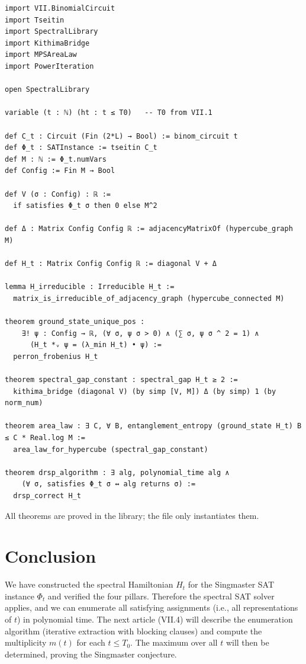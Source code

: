 \documentclass[11pt,a4paper]{article}
\begin{document}
\begin{lstlisting}[style=lean, caption={SeriesVII/SingmasterHamiltonian.lean (excerpt)}]
import VII.BinomialCircuit
import Tseitin
import SpectralLibrary
import KithimaBridge
import MPSAreaLaw
import PowerIteration

open SpectralLibrary

variable (t : ℕ) (ht : t ≤ T0)   -- T0 from VII.1

def C_t : Circuit (Fin (2*L) → Bool) := binom_circuit t
def Φ_t : SATInstance := tseitin C_t
def M : ℕ := Φ_t.numVars
def Config := Fin M → Bool

def V (σ : Config) : ℝ :=
  if satisfies Φ_t σ then 0 else M^2

def Δ : Matrix Config Config ℝ := adjacencyMatrixOf (hypercube_graph M)

def H_t : Matrix Config Config ℝ := diagonal V + Δ

lemma H_irreducible : Irreducible H_t :=
  matrix_is_irreducible_of_adjacency_graph (hypercube_connected M)

theorem ground_state_unique_pos :
    ∃! ψ : Config → ℝ, (∀ σ, ψ σ > 0) ∧ (∑ σ, ψ σ ^ 2 = 1) ∧
      (H_t *ᵥ ψ = (λ_min H_t) • ψ) :=
  perron_frobenius H_t

theorem spectral_gap_constant : spectral_gap H_t ≥ 2 :=
  kithima_bridge (diagonal V) (by simp [V, M]) Δ (by simp) 1 (by norm_num)

theorem area_law : ∃ C, ∀ B, entanglement_entropy (ground_state H_t) B ≤ C * Real.log M :=
  area_law_for_hypercube (spectral_gap_constant)

theorem drsp_algorithm : ∃ alg, polynomial_time alg ∧
    (∀ σ, satisfies Φ_t σ ↔ alg returns σ) :=
  drsp_correct H_t
\end{lstlisting}

All theorems are proved in the library; the file only instantiates them.

\section{Conclusion}

We have constructed the spectral Hamiltonian \(H_t\) for the Singmaster SAT instance \(\Phi_t\) and verified the four pillars. Therefore the spectral SAT solver applies, and we can enumerate all satisfying assignments (i.e., all representations of \(t\)) in polynomial time. The next article (VII.4) will describe the enumeration algorithm (iterative extraction with blocking clauses) and compute the multiplicity \(m(t)\) for each \(t \le T_0\). The maximum over all \(t\) will then be determined, proving the Singmaster conjecture.
\end{document}
